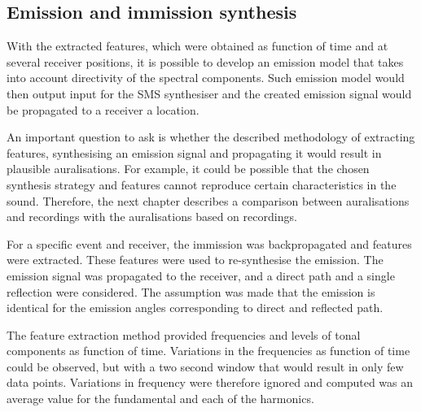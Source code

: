 


\subsection{Emission and immission synthesis}\label{sec:tool:synthesis:synthesis}
With the extracted features, which were obtained as function of time and at
several receiver positions, it is possible to develop an emission model that
takes into account directivity of the spectral components. Such emission model
would then output input for the SMS synthesiser and the created emission signal
would be propagated to a receiver a location.

An important question to ask is whether the described methodology of extracting
features, synthesising an emission signal and propagating it would result in
plausible auralisations. For example, it could be possible that the chosen
synthesis strategy and features cannot reproduce certain characteristics in the
sound. Therefore, the next chapter describes a comparison between auralisations
and recordings with the auralisations based on recordings.

For a specific event and receiver, the immission was backpropagated and features
were extracted. These features were used to re-synthesise the emission. The
emission signal was propagated to the receiver, and a direct path and a single
reflection were considered. The assumption was made that the emission is
identical for the emission angles corresponding to direct and reflected path.

The feature extraction method provided frequencies and levels of tonal
components as function of time. Variations in the frequencies as function of
time could be observed, but with a two second window that would result in only
few data points. Variations in frequency were therefore ignored and computed was an
average value for the fundamental and each of the harmonics.

